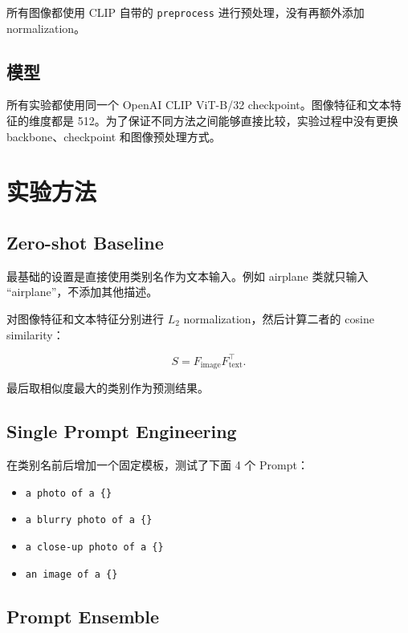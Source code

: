 \documentclass[UTF8,11pt,a4paper]{ctexart}
\begin{document}
所有图像都使用 CLIP 自带的 \texttt{preprocess} 进行预处理，没有再额外添加 normalization。

\subsection{模型}

所有实验都使用同一个 OpenAI CLIP ViT-B/32 checkpoint。图像特征和文本特征的维度都是 512。为了保证不同方法之间能够直接比较，实验过程中没有更换 backbone、checkpoint 和图像预处理方式。

\section{实验方法}

\subsection{Zero-shot Baseline}

最基础的设置是直接使用类别名作为文本输入。例如 airplane 类就只输入 ``airplane''，不添加其他描述。

对图像特征和文本特征分别进行 $L_2$ normalization，然后计算二者的 cosine similarity：

\begin{equation}
S = F_{\text{image}}F_{\text{text}}^{\top}.
\end{equation}

最后取相似度最大的类别作为预测结果。

\subsection{Single Prompt Engineering}

在类别名前后增加一个固定模板，测试了下面 4 个 Prompt：

\begin{itemize}
    \item \texttt{a photo of a \{\}}
    \item \texttt{a blurry photo of a \{\}}
    \item \texttt{a close-up photo of a \{\}}
    \item \texttt{an image of a \{\}}
\end{itemize}

\subsection{Prompt Ensemble}
\end{document}
